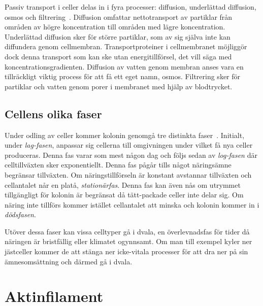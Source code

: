 Passiv transport i celler delas in i fyra processer: diffusion, underlättad diffusion, osmos och filtrering~\cite{Cram_Passivetransport}. Diffusion omfattar nettotransport av partiklar från områden av högre koncentration till områden med lägre koncentration. Underlättad diffusion sker för större partiklar, som av sig själva inte kan diffundera genom cellmembran. Transportproteiner i cellmembranet möjliggör dock denna transport som kan ske utan energitillförsel, det vill säga med koncentrationsgradienten. Diffusion av vatten genom membran anses vara en tillräckligt viktig process för att få ett eget namn, osmos. Filtrering sker för partiklar och vatten genom porer i membranet med hjälp av blodtrycket.


\subsection{Cellens olika faser}

Under odling av celler kommer kolonin genomgå tre distinkta faser~\cite{Heidcamp_Cellfas}. Initialt, under \emph{lag-fasen}, anpassar sig cellerna till omgivningen under vilket få nya celler produceras. Denna fas varar som mest någon dag och följs sedan av \emph{log-fasen} där celltillväxten sker exponentiellt. Denna fas pågår tills något näringsämne begränsar tillväxten. Om näringstillförseln är konstant avstannar tillväxten och cellantalet når en platå, \emph{stationärfas}. Denna fas kan även nås om utrymmet tillgängligt för kolonin är begränsat då tätt-packade celler inte delar sig. 
Om näring inte tillförs kommer istället cellantalet att minska och kolonin kommer in i \emph{dödsfasen}.

Utöver dessa faser kan vissa celltyper gå i dvala, en överlevnadsfas för tider då näringen är bristfällig eller klimatet ogynnsamt. Om man till exempel kyler ner jästceller kommer de att stänga ner icke-vitala processer för att dra ner på sin ämnesomsättning och därmed gå i dvala.  


\section{Aktinfilament}


